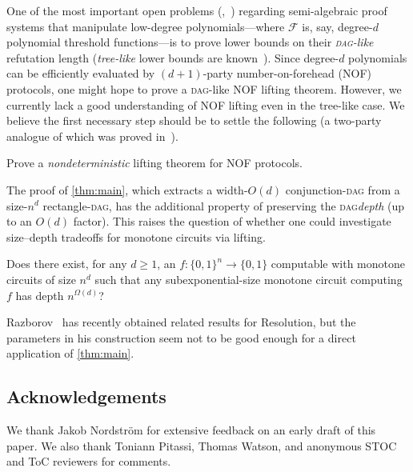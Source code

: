 \documentclass{toc}
\newcommand{\DAG}{\textsc{dag}}
\newcommand{\DAGspace}{\textsc{dag}\xspace}
\newcommand{\calF}{\mathcal{F}}
\begin{document}
One of the most important open problems (\eg,~\cite[\S5]{razborov16proof}) regarding semi-algebraic proof systems that manipulate low-degree polynomials---where $\calF$ is, say, degree-$d$ polynomial threshold functions---is to prove lower bounds on their \emph{\DAG-like} refutation length (\emph{tree-like} lower bounds are known~\cite{beame07lower,goos14cbs}). Since degree-$d$ polynomials can be efficiently evaluated by $(d+1)$-party number-on-forehead (NOF) protocols, one might hope to prove a \DAG-like NOF lifting theorem. However, we currently lack a good understanding of NOF lifting even in the tree-like case. We believe the first necessary step should be to settle the following (a two-party analogue of which was proved in~\cite{goos16rectangles}).
\begin{question}
Prove a \emph{nondeterministic} lifting theorem for NOF protocols.
\end{question}

The proof of \autoref{thm:main}, which extracts a width-$O(d)$ conjunction-\DAGspace from a size-$n^d$ rectangle-\DAGspace, has the additional property of preserving the \DAGspace \emph{depth} (up to an $O(d)$ factor). This raises the question of whether one could investigate size--depth tradeoffs for monotone circuits via lifting.
\begin{question}
Does there exist, for any $d\geq 1$, an $f\colon\{0,1\}^n\to\{0,1\}$ computable with monotone circuits of size $n^d$ such that any subexponential-size monotone circuit computing $f$ has depth $n^{\Omega(d)}$?
\end{question}
Razborov~\cite{razborov16new} has recently obtained related results for Resolution, but the parameters in his construction seem not to be good enough for a direct application of \autoref{thm:main}.

\medskip\bigskip
\subsection*{Acknowledgements}
We thank Jakob Nordstr\"om for extensive feedback on an early draft of this
%
paper.   %
We also thank Toniann Pitassi, Thomas Watson, and anonymous STOC and ToC reviewers for comments. 



%
%
%

%
\end{document}
